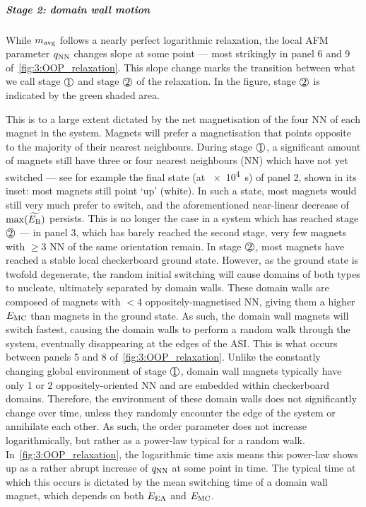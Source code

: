\subparagraph{Stage 2: domain wall motion}
While $m_\mathrm{avg}$ follows a nearly perfect logarithmic relaxation, the local AFM parameter $q_\mathrm{NN}$ changes slope at some point --- most strikingly in panel 6 and 9 of~\cref{fig:3:OOP_relaxation}.
This slope change marks the transition between what we call stage $\circled{1}$ and stage $\circled{2}$ of the relaxation.
In the figure, stage $\circled{2}$ is indicated by the green shaded area. \par
This is to a large extent dictated by the net magnetisation of the four NN of each magnet in the system.
Magnets will prefer a magnetisation that points opposite to the majority of their nearest neighbours. 
During stage $\circled{1}$, a significant amount of magnets still have three or four nearest neighbours (NN) which have not yet switched --- see for example the final state (at \SI{e4}{\second}) of panel 2, shown in its inset: most magnets still point `up' (white).
In such a state, most magnets would still very much prefer to switch, and the aforementioned near-linear decrease of $\max(\widetilde{E_\mathrm{B}})$ persists.
This is no longer the case in a system which has reached stage $\circled{2}$ --- in panel 3, which has barely reached the second stage, very few magnets with $\geq 3$ NN of the same orientation remain.
In stage $\circled{2}$, most magnets have reached a stable local checkerboard ground state.
However, as the ground state is twofold degenerate, the random initial switching will cause domains of both types to nucleate, ultimately separated by domain walls.
These domain walls are composed of magnets with $<4$ oppositely-magnetised NN, giving them a higher $E_\mathrm{MC}$ than magnets in the ground state.
As such, the domain wall magnets will switch fastest, causing the domain walls to perform a random walk through the system, eventually disappearing at the edges of the ASI.
This is what occurs between panels 5 and 8 of~\cref{fig:3:OOP_relaxation}.
Unlike the constantly changing global environment of stage $\circled{1}$, domain wall magnets typically have only 1 or 2 oppositely-oriented NN and are embedded within checkerboard domains.
Therefore, the environment of these domain walls does not significantly change over time, unless they randomly encounter the edge of the system or annihilate each other.
As such, the order parameter does not increase logarithmically, but rather as a power-law typical for a random walk.
In~\cref{fig:3:OOP_relaxation}, the logarithmic time axis means this power-law shows up as a rather abrupt increase of $q_\mathrm{NN}$ at some point in time.
The typical time at which this occurs is dictated by the mean switching time of a domain wall magnet, which depends on both $E_\mathrm{EA}$ and $E_\mathrm{MC}$.

